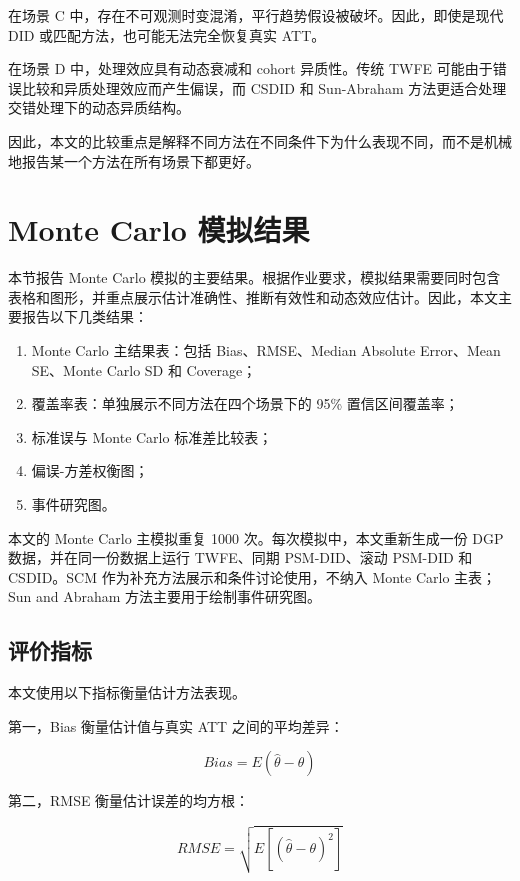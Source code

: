 \documentclass[
  fontset=windows]{ctexart}
\providecommand{\tightlist}{%
  \setlength{\itemsep}{0pt}\setlength{\parskip}{0pt}}
\begin{document}
在场景 C 中，存在不可观测时变混淆，平行趋势假设被破坏。因此，即使是现代
DID 或匹配方法，也可能无法完全恢复真实 ATT。

在场景 D 中，处理效应具有动态衰减和 cohort 异质性。传统 TWFE
可能由于错误比较和异质处理效应而产生偏误，而 CSDID 和 Sun-Abraham
方法更适合处理交错处理下的动态异质结构。

因此，本文的比较重点是解释不同方法在不同条件下为什么表现不同，而不是机械地报告某一个方法在所有场景下都更好。

\section{Monte Carlo
模拟结果}\label{monte-carlo-ux6a21ux62dfux7ed3ux679c}

本节报告 Monte Carlo
模拟的主要结果。根据作业要求，模拟结果需要同时包含表格和图形，并重点展示估计准确性、推断有效性和动态效应估计。因此，本文主要报告以下几类结果：

\begin{enumerate}
\def\labelenumi{\arabic{enumi}.}
\tightlist
\item
  Monte Carlo 主结果表：包括 Bias、RMSE、Median Absolute Error、Mean
  SE、Monte Carlo SD 和 Coverage；
\item
  覆盖率表：单独展示不同方法在四个场景下的 95\% 置信区间覆盖率；
\item
  标准误与 Monte Carlo 标准差比较表；
\item
  偏误-方差权衡图；
\item
  事件研究图。
\end{enumerate}

本文的 Monte Carlo 主模拟重复 1000 次。每次模拟中，本文重新生成一份 DGP
数据，并在同一份数据上运行 TWFE、同期 PSM-DID、滚动 PSM-DID 和
CSDID。SCM 作为补充方法展示和条件讨论使用，不纳入 Monte Carlo 主表；Sun
and Abraham 方法主要用于绘制事件研究图。

\subsection{评价指标}\label{ux8bc4ux4ef7ux6307ux6807}

本文使用以下指标衡量估计方法表现。

第一，Bias 衡量估计值与真实 ATT 之间的平均差异：

\[
Bias = E(\hat{\theta}-\theta)
\]

第二，RMSE 衡量估计误差的均方根：

\[
RMSE=\sqrt{E[(\hat{\theta}-\theta)^2]}
\]
\end{document}
